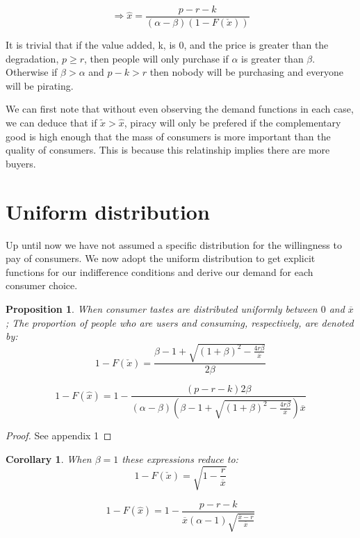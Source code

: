 \documentclass{article}
\newtheorem{corollary}{Corollary}
\newtheorem{proposition}{Proposition}
\begin{document}
\begin{equation} \label{eq:indi2}
\Rightarrow \hat{x} = \frac{p-r-k}{(\alpha - \beta)(1 - F(\check{x}))}
\end{equation}


It is trivial that if the value added, k, is 0, and the price is greater than the degradation, $p\geq r$, then people will only purchase if $\alpha$ is greater than $\beta$. Otherwise if $\beta>\alpha$ and $p-k>r$ then nobody will be purchasing and everyone will be pirating. 

We can first note that without even observing the demand functions in each case, we can deduce that if $\tilde{x}>\hat{x}$, piracy will only be prefered if the complementary good is high enough that the mass of consumers is more important than the quality of consumers. This is because this relatinship implies there are more buyers. 

\section{Uniform distribution}

Up until now we have not assumed a specific distribution for the willingness to pay of consumers. We now adopt the uniform distribution to get explicit functions for our indifference conditions and derive our demand for each consumer choice. 


\begin{proposition}
When consumer tastes are distributed uniformly between $0$ and $\overline{x}$;  The proportion of people who are users and consuming, respectively, are denoted by: 
\begin{equation}\label{eq:1}
1 - F(\check{x}) =\frac{ \beta  - 1 + \sqrt{ (1+\beta)^{2}- \frac{4 r \beta}{\overline{x}}  }}{2 \beta }
\end{equation}

\begin{equation}\label{eq:2}
1 - F(\hat{x})=1-\frac{(p-r-k)2 \beta}{(\alpha - \beta) \left( \beta  - 1 + \sqrt{ (1+\beta)^{2}- \frac{4 r \beta}{\overline{x}}  }\right) \overline{x} }
\end{equation}


\end{proposition}

\begin{proof}
See appendix 1
\end{proof}

\begin{corollary}
When $\beta=1$ these expressions reduce to:
\begin{equation}\label{eq:3}
1 - F(\check{x}) = \sqrt{1-\frac{r}{\overline{x}}}
\end{equation}

\begin{equation}\label{eq:4}
1 - F(\hat{x})= 1 - \frac{p-r-k}{\overline{x}(\alpha - 1) \sqrt{\frac{\overline{x}-r}{\overline{x}}} }
\end{equation}

\end{corollary}
\end{document}
